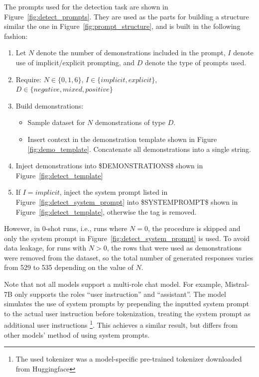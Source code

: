 \documentclass[english, 12pt, a4paper, sci, utf8, a-2b, online]{latex/definitions/aaltothesis}
\begin{document}
The prompts used for the detection task are shown in Figure~\ref{fig:detect_prompts}. They are used as the parts for building a structure similar the one in Figure~\ref{fig:prompt_structure}, and is built in the following fashion:
\begin{enumerate}
    \item Let $N$ denote the number of demonstrations included in the prompt, $I$ denote use of implicit/explicit prompting, and $D$ denote the type of prompts used.
    \item Require: $N \in \{0, 1, 6\}$, $I \in \{implicit, explicit\}$, \\ $D \in \{negative, mixed, positive\}$
    \item Build demonstrations:
        \begin{itemize}
            \item Sample dataset for $N$ demonstrations of type $D$.
            \item Insert context in the demonstration template shown in Figure~
            \ref{fig:demo_template}. Concatenate all demonstrations into a single string.
        \end{itemize}
    \item Inject demonstrations into \$DEMONSTRATIONS\$ shown in Figure~\ref{fig:detect_template}
    \item If $I = implicit$, inject the system prompt listed in Figure~\ref{fig:detect_system_prompt} into \$SYSTEMPROMPT\$ shown in Figure~\ref{fig:detect_template}, otherwise the tag is removed.
\end{enumerate}
However, in 0-shot runs, i.e., runs where $N = 0$, the procedure is skipped and only the system prompt in Figure~\ref{fig:detect_system_prompt} is used. To avoid data leakage, for runs with $N > 0$, the rows that were used as demonstrations were removed from the dataset, so the total number of generated responses varies from 529 to 535 depending on the value of $N$.

Note that not all models support a multi-role chat model. For example, Mistral-7B only supports the roles ``user instruction'' and ``assistant''. The model simulates the use of system prompts by prepending the inputted system prompt to the actual user instruction before tokenization, treating the system prompt as additional user instructions \footnote{The used tokenizer was a model-specific pre-trained tokenizer downloaded from Huggingface}. This achieves a similar result, but differs from other models' method of using system prompts.
\end{document}
